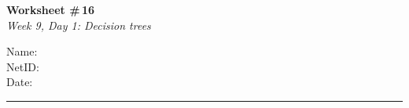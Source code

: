 \documentclass[11pt]{article}
\begin{document}
\noindent
\begin{minipage}[t]{0.55\textwidth}
  \vspace{0pt}
  {\LARGE \textbf{Worksheet \#\,16}} \\[0.3em]
  {\large \textit{Week 9, Day 1: Decision trees}}
\end{minipage}
\hfill
\begin{minipage}[t]{0.40\textwidth}
  \vspace{0pt}
  \begin{mdframed}[linecolor=black, linewidth=1pt, innertopmargin=10pt, innerbottommargin=10pt]
    \small
    \vspace{0.4cm}
    Name: \underline{\hspace{4.5cm}} \\[1em]
    NetID: \underline{\hspace{4.3cm}} \\[1em]
    Date: \underline{\hspace{4.4cm}} \\
  \end{mdframed}
\end{minipage}

\vspace{1em}
\noindent\rule{\linewidth}{1pt}
\vspace{0.2em}
\end{document}
